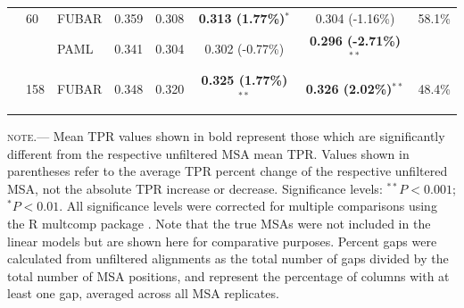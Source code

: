 \documentclass[11pt]{article}
\begin{document}
\begin{table}[htbp]
\begin{adjustwidth}{-1cm}{}
\begin{tabular}{l l l c c c c c}
 & 60 & FUBAR & 0.359 & 0.308 & \textbf{0.313 (1.77\%)$^{\ast}$} & 0.304 (-1.16\%) & 58.1\%\\
 & & PAML & 0.341 & 0.304 &0.302 (-0.77\%) & \textbf{0.296 (-2.71\%)$^{\ast\ast}$} & \\

 & 158 & FUBAR & 0.348 & 0.320 & \textbf{0.325 (1.77\%)$^{\ast\ast}$} & \textbf{0.326 (2.02\%)$^{\ast\ast}$} & 48.4\% \\
\noalign{\smallskip}\hline\noalign{\smallskip}
\end{tabular}
\newline
\textsc{note.}--- Mean TPR values shown in bold represent those which are significantly different from the respective unfiltered MSA mean TPR. Values shown in parentheses refer to the average TPR percent change of the respective unfiltered MSA, not the absolute TPR increase or decrease. Significance levels:  $^{\ast\ast} P < 0.001$; $^{\ast} P < 0.01$. All significance levels were corrected for multiple comparisons using the R multcomp package \citep{Hothorn2008}. Note that the true MSAs were not included in the linear models but are shown here for comparative purposes. Percent gaps were calculated from unfiltered alignments as the total number of gaps divided by the total number of MSA positions, and represent the percentage of columns with at least one gap, averaged across all MSA replicates.
\end{adjustwidth}
\end{table}
\end{document}
